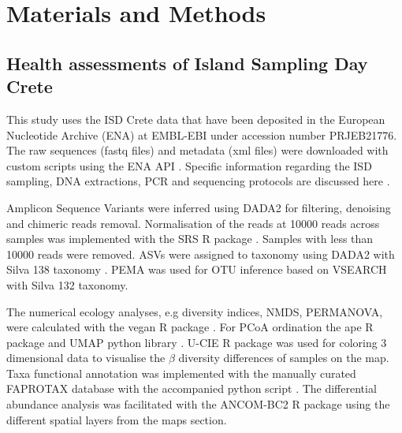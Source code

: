 \documentclass[a4paper,12pt]{article}
\begin{document}
\section{Materials and Methods}\label{integration_methods}


\subsection{Health assessments of Island Sampling Day Crete}\label{isd_data}

This study uses the ISD Crete data that have been deposited
in the European Nucleotide Archive (ENA) at EMBL-EBI under accession number PRJEB21776.
The raw sequences (fastq files) and metadata (xml files) were downloaded with custom scripts using the ENA API \parencite{ocathail2024the-european}.
Specific information regarding the ISD sampling, DNA extractions, PCR and sequencing
protocols are discussed here \parencite{holm2025first}.

Amplicon Sequence Variants were inferred using DADA2 \parencite{Callahan2016} for 
filtering, denoising and chimeric reads removal. Normalisation of the reads at 10000 reads
across samples was implemented with the SRS R package \parencite{Beule2020}. Samples
with less than 10000 reads were removed. ASVs were assigned to taxonomy using 
DADA2 with Silva 138 taxonomy \parencite{quast_silva_2013}.
PEMA was used for OTU inference based on VSEARCH \parencite{zafeiropoulos2020pema} with Silva 132 taxonomy.

The numerical ecology analyses, e.g diversity indices, NMDS, PERMANOVA, were calculated
with the vegan R package \parencite{oksanen2024vegan}.
For PCoA ordination the ape R package \parencite{Paradis2004} and UMAP python library \parencite{mcinnes2018umap-software}.
U-CIE R package was used for coloring 3 dimensional data \parencite{Koutrouli2022} to 
visualise the $\beta$ diversity differences of samples on the map.
Taxa functional annotation was implemented with the manually curated FAPROTAX database
with the accompanied python script \parencite{loucaDecouplingFunctionTaxonomy2016}.
The differential abundance analysis was facilitated with the ANCOM-BC2 R package \parencite{Lin2023} using the 
different spatial layers from the maps section.
\end{document}
